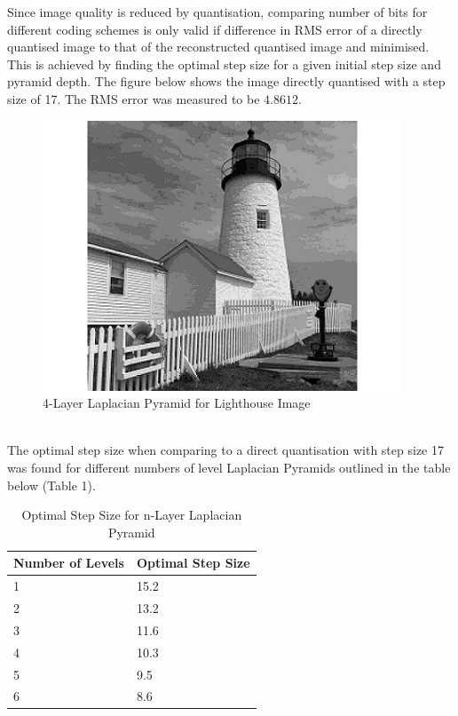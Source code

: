 \documentclass{article}					%
\begin{document}
Since image quality is reduced by quantisation, comparing number of bits for different coding schemes is only valid if difference in RMS error of a directly quantised image to that of the reconstructed quantised image and minimised. This is achieved by finding the optimal step size for a given initial step size and pyramid depth. The figure below shows the image directly quantised with a step size of 17. The RMS error was measured to be $4.8612$.
\begin{figure}[ht!]
\begin{centering}
\includegraphics{19}
\caption{4-Layer Laplacian Pyramid for Lighthouse Image}
\end{centering}
\end{figure}\\

The optimal step size when comparing to a direct quantisation with step size 17 was found for different numbers of level Laplacian Pyramids outlined in the table below (Table 1).
\begin{table}[h!]
\begin{centering}
\begin{tabular}{|l|l|}
\hline
Number of Levels & Optimal Step Size \\ \hline
1                & 15.2              \\ \hline
2                & 13.2              \\ \hline
3                & 11.6              \\ \hline
4                & 10.3              \\ \hline
5                & 9.5               \\ \hline
6                & 8.6               \\ \hline
\end{tabular}
\caption{Optimal Step Size for n-Layer Laplacian Pyramid}
\end{centering}
\end{table}\\
\end{document}
